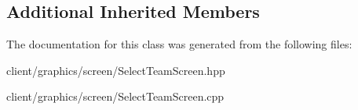 \subsection*{Additional Inherited Members}


The documentation for this class was generated from the following files\-:\begin{DoxyCompactItemize}
\item 
client/graphics/screen/Select\-Team\-Screen.\-hpp\item 
client/graphics/screen/Select\-Team\-Screen.\-cpp\end{DoxyCompactItemize}
